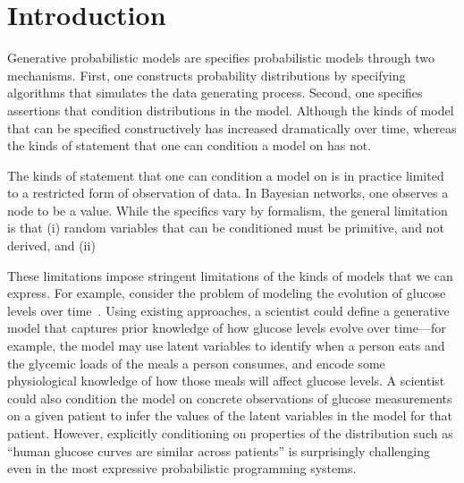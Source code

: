 \section{Introduction}

Generative probabilistic models are specifies probabilistic models through two mechanisms.
First, one constructs probability distributions by specifying algorithms that simulates the data generating process.
Second, one specifies assertions that condition distributions in the model.
Although the kinds of model that can be specified constructively has increased dramatically over time, whereas the kinds of statement that one can condition a model on has not.

The kinds of statement that one can condition a model on is in practice limited to a restricted form of observation of data.
In Bayesian networks, one observes a node to be a value.
While the specifics vary by formalism, the general limitation is that (i) random variables that can be conditioned must be primitive, and not derived, and (ii)

These limitations impose stringent limitations of the kinds of models that we can express.
For example, consider the problem of modeling the evolution of glucose levels over time~\citep{levine2017offline}. Using existing approaches, a scientist could define a generative model that captures prior knowledge of how glucose levels evolve over time---for example, the model may use latent variables to identify when a person eats and the glycemic loads of the meals a person consumes, and encode some physiological knowledge of how those meals will affect glucose levels. A scientist could also condition the model on concrete observations of glucose measurements on a given patient to infer the values of the latent variables in the model for that patient. However, explicitly conditioning on properties of the distribution such as ``human glucose curves are similar across patients'' is surprisingly challenging even in the most expressive probabilistic programming systems. 

